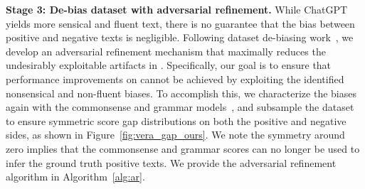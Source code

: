 \textbf{Stage 3: De-bias dataset with adversarial refinement.}
While ChatGPT yields more sensical and fluent text, there is no guarantee that the bias between positive and negative texts is negligible.
Following dataset de-biasing work~\cite{zellers2018swag,sakaguchi2021winogrande,le2020adversarial}, we develop an adversarial refinement mechanism that maximally reduces the undesirably exploitable artifacts in \method.
Specifically, our goal is to ensure that performance improvements on \method cannot be achieved by exploiting the identified nonsensical and non-fluent biases. To accomplish this, we characterize the biases again with the commonsense and grammar models~\cite{liu2023vera,morris2020textattack}, and subsample the dataset to ensure symmetric score gap distributions on both the positive and negative sides, as shown in Figure~\ref{fig:vera_gap_ours}. 
We note the symmetry around zero implies that the commonsense and grammar scores can no longer be used to infer the ground truth positive texts.
We provide the adversarial refinement algorithm in Algorithm~\ref{alg:ar}.



